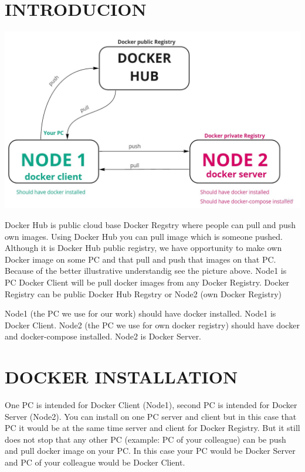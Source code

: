\documentclass[12pt]{report}
\newcommand{\mygreen}[1]{{\color{my_green}#1}}
\newcommand{\myred}[1]{{\color{my_red}#1}}
\begin{document}
\section{INTRODUCION}

\begin{center}
	\includegraphics[scale=0.25]{introduction1.png}
\end{center}



Docker Hub is public cloud base Docker Regstry where people can pull and push own images. Using Docker Hub you can pull image which is someone pushed.
Although it is Docker Hub public registry, we have opportunity to make own Docker image on some PC and that pull and push that images on that PC.
\newline
Because of the better illustrative understandig see the picture above.
\newline
Node1 is PC Docker Client will be pull docker images from any Docker Registry. Docker Registry can be public Docker Hub Regstry or Node2 (own Docker Registry)
\newline


\mygreen{Node1} (the PC we use for our work) should have \mygreen{docker} installed. Node1 is Docker Client.
\myred{Node2} (the PC we use for own docker registry) should have \myred{docker}  and \myred{docker-compose} installed. Node2 is Docker Server.



\section{DOCKER INSTALLATION}
One PC is intended for Docker Client (\mygreen{Node1}), second PC is intended for Docker Server (\myred{Node2}). You can install on one PC server and client but in this case that PC it would be at the same time server and client for Docker Registry. But it still does not stop that any other PC (example: PC of your colleague) can be push and pull docker image on your PC. In this case your PC would be Docker Server and PC of your colleague would be Docker Client.
\end{document}
